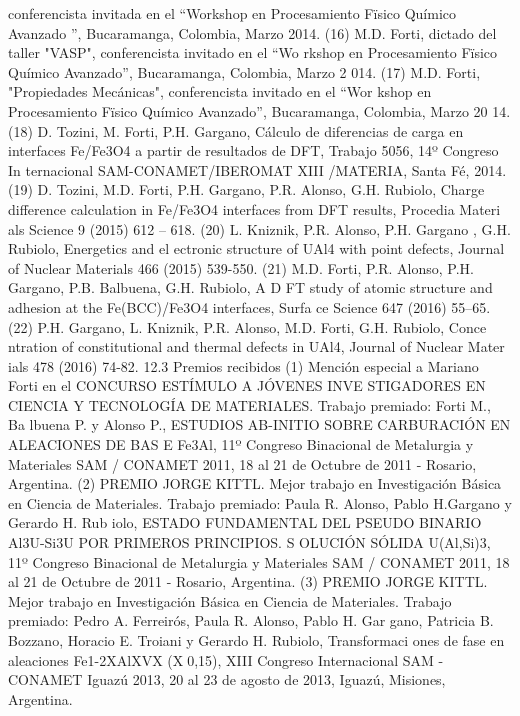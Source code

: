  conferencista invitada en el “Workshop en Procesamiento Fïsico Químico Avanzado
”, Bucaramanga, Colombia, Marzo 2014.
    (16) M.D. Forti, dictado del taller "VASP", conferencista invitado en el “Wo
rkshop en Procesamiento Fïsico Químico Avanzado”, Bucaramanga, Colombia, Marzo 2
014.
    (17)  M.D. Forti, "Propiedades Mecánicas", conferencista invitado en el “Wor
kshop en Procesamiento Fïsico Químico Avanzado”, Bucaramanga, Colombia, Marzo 20
14.
    (18)  D. Tozini, M. Forti, P.H. Gargano, Cálculo de diferencias de carga en 
interfaces Fe/Fe3O4 a partir de resultados de DFT, Trabajo 5056, 14º Congreso In
ternacional SAM-CONAMET/IBEROMAT XIII /MATERIA, Santa Fé, 2014.
    (19)  D. Tozini, M.D. Forti, P.H. Gargano, P.R. Alonso, G.H. Rubiolo, Charge
 difference calculation in Fe/Fe3O4 interfaces from DFT results, Procedia Materi
als Science 9 (2015) 612 – 618.
    (20) L. Kniznik, P.R. Alonso, P.H. Gargano , G.H. Rubiolo, Energetics and el
ectronic structure of UAl4 with point defects, Journal of Nuclear Materials 466 
(2015) 539-550.
    (21) M.D. Forti, P.R. Alonso, P.H. Gargano, P.B. Balbuena, G.H. Rubiolo, A D
FT study of atomic structure and adhesion at the Fe(BCC)/Fe3O4 interfaces, Surfa
ce Science 647 (2016) 55–65.
    (22)  P.H. Gargano, L. Kniznik, P.R. Alonso, M.D. Forti, G.H. Rubiolo, Conce
ntration of constitutional and thermal defects in UAl4, Journal of Nuclear Mater
ials 478 (2016) 74-82.
12.3  Premios recibidos 
    (1)  Mención especial a Mariano Forti en el CONCURSO ESTÍMULO A JÓVENES INVE
STIGADORES EN CIENCIA Y TECNOLOGÍA DE MATERIALES. Trabajo premiado: Forti M., Ba
lbuena P. y Alonso P., ESTUDIOS AB-INITIO SOBRE CARBURACIÓN EN ALEACIONES DE BAS
E Fe3Al, 11º Congreso Binacional de Metalurgia y Materiales SAM / CONAMET 2011, 
18 al 21 de Octubre de 2011 - Rosario, Argentina.
    (2)  PREMIO JORGE KITTL. Mejor trabajo en Investigación Básica en Ciencia de
 Materiales. Trabajo premiado: Paula R. Alonso, Pablo H.Gargano y Gerardo H. Rub
iolo, ESTADO FUNDAMENTAL DEL PSEUDO BINARIO Al3U-Si3U POR PRIMEROS PRINCIPIOS. S
OLUCIÓN SÓLIDA U(Al,Si)3, 11º Congreso Binacional de Metalurgia y Materiales SAM
 / CONAMET 2011, 18 al 21 de Octubre de 2011 - Rosario, Argentina.
    (3)  PREMIO JORGE KITTL. Mejor trabajo en Investigación Básica en Ciencia de
 Materiales. Trabajo premiado: Pedro A. Ferreirós, Paula R. Alonso, Pablo H. Gar
gano, Patricia B. Bozzano, Horacio E. Troiani y Gerardo H. Rubiolo, Transformaci
ones de fase en aleaciones Fe1-2XAlXVX (X0,15), XIII Congreso Internacional SAM
-CONAMET Iguazú 2013, 20 al 23 de agosto de 2013, Iguazú, Misiones, Argentina.
